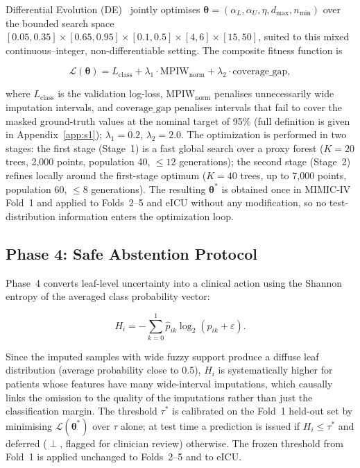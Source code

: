 \documentclass[journal]{IEEEtran}
\begin{document}
Differential Evolution (DE)~\cite{storn1997differential} jointly optimises $\boldsymbol{\theta}=(\alpha_L,\alpha_U,\eta,d_{\max},n_{\min})$ over the bounded search space $[0.05,0.35]\times[0.65,0.95]\times[0.1,0.5]\times[4,6]\times[15,50]$, suited to this mixed continuous--integer, non-differentiable setting. The composite fitness function is

\begin{equation}
	\mathcal{L}(\boldsymbol{\theta})
	=L_{\text{class}}
	+\lambda_1\cdot\text{MPIW}_{\text{norm}}
	+\lambda_2\cdot\text{coverage\_gap},
	\label{eq:de_fitness}
\end{equation}

\noindent where $L_{\text{class}}$ is the validation log-loss, $\text{MPIW}_{\text{norm}}$ penalises unnecessarily wide imputation intervals, and $\text{coverage\_gap}$ penalises intervals that fail to cover the masked ground-truth values at the nominal target of 95\% (full definition is given in Appendix~\ref{app:s1}); $\lambda_1=0.2$, $\lambda_2=2.0$. The optimization is performed in two stages: the first stage (Stage~1) is a fast global search over a proxy forest ($K=20$ trees, 2,000 points, population 40, $\le12$ generations); the second stage (Stage~2) refines locally around the first-stage optimum ($K=40$ trees, up to 7,000 points, population 60, $\le8$ generations). The resulting $\boldsymbol{\theta}^*$ is obtained once in MIMIC-IV Fold~1 and applied to Folds~2--5 and eICU without any modification, so no test-distribution information enters the optimization loop.

\subsection{Phase 4: Safe Abstention Protocol}
\label{sec:phase4}

Phase~4 converts leaf-level uncertainty into a clinical action using the Shannon entropy of the averaged class probability vector:

\begin{equation}
	H_i=-\sum_{k=0}^{1}\hat{p}_{ik}\log_2(\hat{p}_{ik}+\varepsilon).
	\label{eq:output_entropy}
\end{equation}

Since the imputed samples with wide fuzzy support produce a diffuse leaf distribution (average probability close to 0.5), $H_i$ is systematically higher for patients whose features have many wide-interval imputations, which causally links the omission to the quality of the imputations rather than just the classification margin. The threshold $\tau^*$ is calibrated on the Fold~1 held-out set by minimising $\mathcal{L}(\boldsymbol{\theta}^*)$ over $\tau$ alone; at test time a prediction is issued if $H_i\le\tau^*$ and deferred ($\perp$, flagged for clinician review) otherwise. The frozen threshold from Fold~1 is applied unchanged to Folds~2--5 and to eICU.
\end{document}
